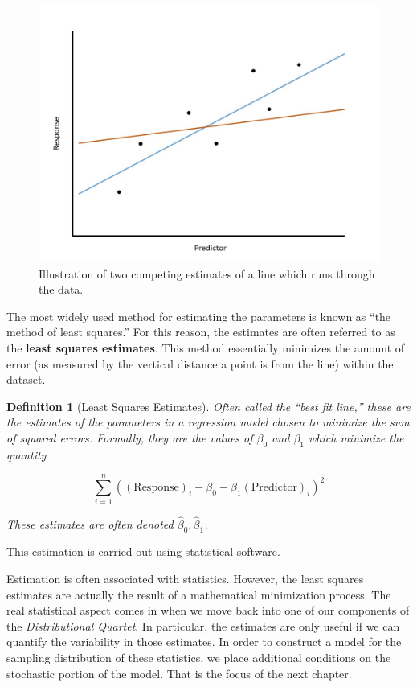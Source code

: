 \documentclass[
]{book}
\theoremstyle{plain}
\theoremstyle{mydefn}
\newtheorem{definition}{Definition}[chapter]
\theoremstyle{myexmpl}
\theoremstyle{remark}
\begin{document}
\begin{figure}

{\centering \includegraphics[width=0.8\linewidth]{./images/RegModel-LeastSquares} 

}

\caption{Illustration of two competing estimates of a line which runs through the data.}\label{fig:regmodel-least-squares}
\end{figure}

The most widely used method for estimating the parameters is known as ``the method of least squares.'' For this reason, the estimates are often referred to as the \textbf{least squares estimates}. This method essentially minimizes the amount of error (as measured by the vertical distance a point is from the line) within the dataset.

\begin{definition}[Least Squares Estimates]
\protect\hypertarget{def:defn-least-squares-estimates}{}{\label{def:defn-least-squares-estimates} {} }Often called the ``best fit line,'' these are the estimates of the parameters in a regression model chosen to minimize the sum of squared errors. Formally, they are the values of \(\beta_0\) and \(\beta_1\) which minimize the quantity

\[\sum_{i=1}^n \left((\text{Response})_i - \beta_0 - \beta_1(\text{Predictor})_{i}\right)^2\]

These estimates are often denoted \(\widehat{\beta}_0, \widehat{\beta}_1\).
\end{definition}

This estimation is carried out using statistical software.

Estimation is often associated with statistics. However, the least squares estimates are actually the result of a mathematical minimization process. The real statistical aspect comes in when we move back into one of our components of the \emph{Distributional Quartet}. In particular, the estimates are only useful if we can quantify the variability in those estimates. In order to construct a model for the sampling distribution of these statistics, we place additional conditions on the stochastic portion of the model. That is the focus of the next chapter.
\end{document}
